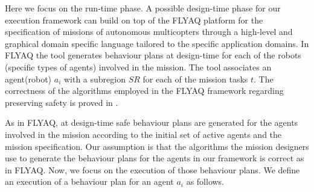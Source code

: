\documentclass[journal]{IEEEtran}
\theoremstyle{definition}
\begin{document}
Here we focus on the run-time phase.  
A possible design-time phase for our execution framework can build on top of
the FLYAQ \cite{bozhinoski2015flyaq, di2013engineering} platform for the specification of missions of autonomous multicopters through a high-level and graphical domain specific language tailored to the specific application
domains. In FLYAQ\cite{bozhinoski2015flyaq, di2013engineering} the tool generates behaviour plans at design-time for each of the robots (specific types of agents) involved in the mission. The tool associates an agent(robot) $a_i$ with a subregion $SR$ for each of the mission tasks $t$. The correctness of the algorithms employed in the FLYAQ framework regarding preserving safety is proved in \cite{ruscio2016automatic}.

As in FLYAQ\cite{bozhinoski2015flyaq, di2013engineering}, at design-time safe behaviour plans are generated for the agents involved in the mission  according to the initial set of active agents and the mission specification. 
Our assumption is that the algorithms the mission designers use to generate the behaviour plans for the agents in our framework is correct as in FLYAQ. 
Now, we focus on the execution of those behaviour plans.
We define an execution of a behaviour plan for an agent $a_i$ as follows.
\end{document}
